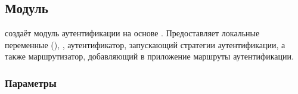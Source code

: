 \subsection{Модуль }\label{page-FPauth-module-FPauth-module-Make+u+Auth}%
 создаёт модуль аутентификации на основе \hyperref[page-FPauth-core-module-FPauth+u+core-module-Auth+u+sign-module-type-MODEL]{}. Предоставляет локальные переменные (), , аутентификатор, запускающий стратегии аутентификации, а также маршрутизатор, добавляющий в приложение маршруты аутентификации.

\subsubsection{Параметры\label{parameters}}%
